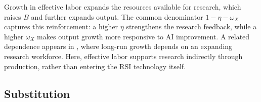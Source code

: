 Growth in effective labor expands the resources available for research, which raises $B$ and further
expands output. The common denominator $1-\eta-\omega_X$ captures
this reinforcement: a higher $\eta$ strengthens the research feedback,
while a higher $\omega_X$ makes output growth more responsive to AI
improvement.
A related dependence appears in \citet{jones1995}, where long-run growth
depends on an expanding research workforce. Here, effective labor supports
research indirectly through production, rather than entering the RSI
technology itself.

\subsection{Substitution}
\label{subsec:rewrite-uncapped}

